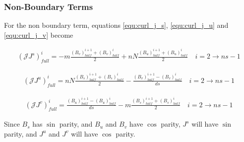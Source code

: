 \documentclass[11pt]{article}
\newcommand{\brackets}[1]{\left(#1\right)}
\newcommand{\equ}[2]{
	\begin{equation}
    \begin{split}
	#1
	\label{#2}
	\end{split}
	\end{equation}
}
\begin{document}
\subsubsection{Non-Boundary Terms}
For the non boundary term, equations \ref{equ:curl_j_s}, \ref{equ:curl_j_u} and \ref{equ:curl_j_v} become
\equ{
\brackets{\mathcal{J}J^{s}}^{i}_{full}=-m\frac{\brackets{B_{v}}^{i+1}_{half}+\brackets{B_{v}}^{i}_{half}}{2}+nN\frac{\brackets{B_{u}}^{i+1}_{half}+\brackets{B_{u}}^{i}_{half}}{2}\quad i=2\rightarrow ns-1
}{equ:curl_j_s_i}
\equ{
\brackets{\mathcal{J}J^{u}}^{i}_{full}=
nN\frac{\brackets{B_{s}}^{i+1}_{half}+\brackets{B_{s}}^{i}_{half}}{2}-\frac{\brackets{B_{v}}^{i+1}_{half}-\brackets{B_{v}}^{i}_{half}}{ds}\quad i=2\rightarrow ns-1
}{equ:curl_j_u_i}
\equ{
\brackets{\mathcal{J}J^{v}}^{i}_{full}=\frac{\brackets{B_{u}}^{i+1}_{half}-\brackets{B_{u}}^{i}_{half}}{ds}-m\frac{\brackets{B_{s}}^{i+1}_{half}+\brackets{B_{s}}^{i}_{half}}{2}\quad i=2\rightarrow ns-1
}{equ:curl_j_v_i}
Since $B_{s}$ has $\sin$ parity, and $B_{u}$ and $B_{v}$ have $\cos$ parity, $J^{s}$ will have $\sin$ parity, and $J^{u}$ and $J^{v}$ will have $\cos$ parity.
\end{document}
